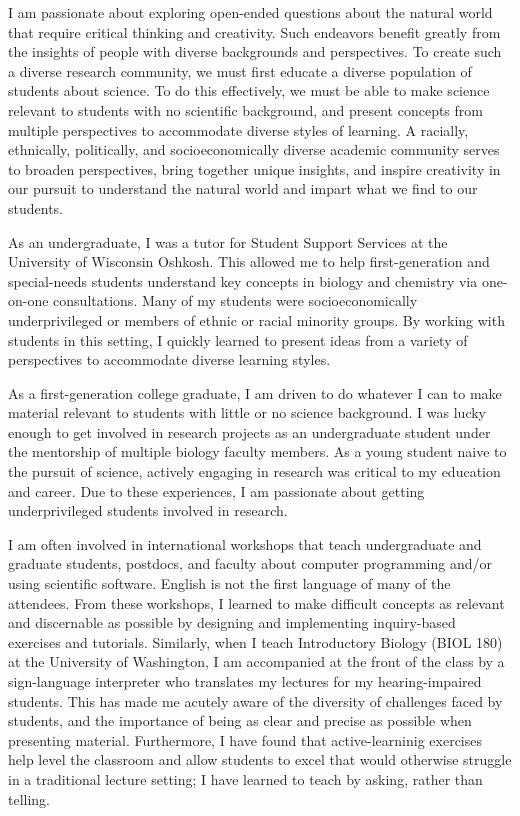 I am passionate about exploring open-ended questions about the natural world
that require critical thinking and creativity.
Such endeavors benefit greatly from the insights of people with diverse
backgrounds and perspectives.
To create such a diverse research community, we must first educate a diverse
population of students about science.
To do this effectively, we must be able to make science relevant to students
with no scientific background, and present concepts from multiple perspectives
to accommodate diverse styles of learning.
A racially, ethnically, politically, and socioeconomically diverse academic
community serves to broaden perspectives, bring together unique insights, and
inspire creativity in our pursuit to understand the natural world and impart
what we find to our students.

As an undergraduate, I was a tutor for Student Support Services at the
University of Wisconsin Oshkosh.
This allowed me to help first-generation and special-needs students understand
key concepts in biology and chemistry via one-on-one consultations.
Many of my students were socioeconomically underprivileged or members of ethnic
or racial minority groups.
By working with students in this setting, I quickly learned to present ideas
from a variety of perspectives to accommodate diverse learning styles.

As a first-generation college graduate, I am driven to do whatever I can to
make material relevant to students with little or no science background.
I was lucky enough to get involved in research projects as an undergraduate
student under the mentorship of multiple biology faculty members.
As a young student naive to the pursuit of science, actively engaging in
research was critical to my education and career.
Due to these experiences, I am passionate about getting underprivileged
students involved in research.

I am often involved in international workshops that teach undergraduate and
graduate students, postdocs, and faculty about computer programming and/or
using scientific software.
English is not the first language of many of the attendees.
From these workshops, I learned to make difficult concepts as relevant and
discernable as possible by designing and implementing inquiry-based exercises
and tutorials.
Similarly, when I teach Introductory Biology (BIOL 180) at the University of
Washington, I am accompanied at the front of the class by a sign-language
interpreter who translates my lectures for my hearing-impaired students.
This has made me acutely aware of the diversity of challenges faced by
students, and the importance of being as clear and precise as possible when
presenting material.
Furthermore, I have found that active-learninig exercises help level the
classroom and allow students to excel that would otherwise struggle in a
traditional lecture setting; I have learned to teach by asking, rather than
telling.


